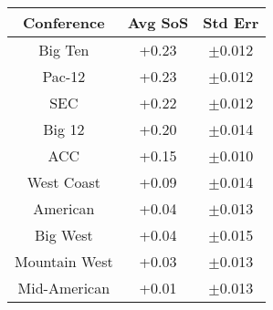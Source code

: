   \begin{tabular}{c|cc}
    Conference      & Avg SoS & Std Err\\
    \hline
    Big Ten         & +0.23   & $\pm$0.012\\
    Pac-12          & +0.23   & $\pm$0.012\\
    SEC             & +0.22   & $\pm$0.012\\
    Big 12          & +0.20   & $\pm$0.014\\
    ACC             & +0.15   & $\pm$0.010\\
    West Coast      & +0.09   & $\pm$0.014\\
    American        & +0.04   & $\pm$0.013\\
    Big West        & +0.04   & $\pm$0.015\\
    Mountain West   & +0.03   & $\pm$0.013\\
    Mid-American    & +0.01   & $\pm$0.013\\
  \end{tabular}